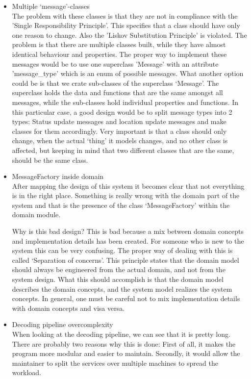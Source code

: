 \documentclass[12pt]{article}
\begin{document}
\begin{itemize}
\item Multiple `message'-classes\\
The problem with these classes is that they are not in compliance with the 'Single Responsibility Principle'. This specifies that a class should have only one reason to change. Also the 'Liskov Substitution Principle'  is violated. The problem is that there are multiple classes built, while they have almost identical behaviour and properties. The proper way to implement these messages would be to use one superclass 'Message' with an attribute 'message\_type' which is an enum of possible messages. What another option could be is that we crate sub-classes of the superclass `Message'. The superclass holds the data and functions that are the same amongst all messages, while the sub-classes hold individual properties and functions. 
In this particular case, a good design would be to split message types into 2 types: Status update messages and location update messages and make classes for them accordingly. Very important is that a class should only change, when the actual `thing' it models changes, and no other class is affected, but keeping in mind that two different classes that are the same, should be the same class.

\item MessageFactory inside domain\\
After mapping the design of this system it becomes clear that not everything is in the right place. Something is really wrong with the domain part of the system and that is the presence of the class `MessageFactory' within the domain module.

Why is this bad design? 
This is bad because a mix between domain concepts and implementation details has been created. For someone who is new to the system this can be very confusing. The proper way of dealing with this is called `Separation of concerns'. This principle states that the domain model should always be engineered from the actual domain, and not from the system design. What this should accomplish is that the domain model describes the domain concepts, and the system model realizes the system concepts. In general, one must be careful not to mix implementation details with domain concepts and visa versa.

\item Decoding pipeline overcomplexity\\
When looking at the decoding pipeline, we can see that it is pretty long. There are probably two reasons why this is done: First of all, it makes the program more modular and easier to maintain. Secondly, it would allow the maintainer to split the services over multiple machines to spread the workload.


\end{itemize}
\end{document}
